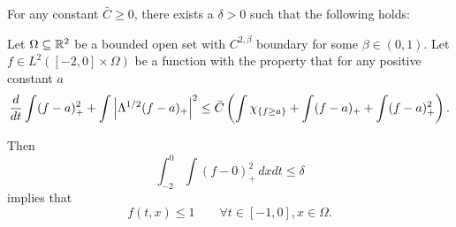 \begin{lemma} \label{thm:DG1 skeleton}
For any constant $\bar{C} \geq 0$, there exists a $\delta>0$ such that the following holds:

Let $\Omega \subseteq \mathbb{R}^2$ be a bounded open set with $C^{2,\beta}$ boundary for some $\beta \in (0,1)$.  
Let $f \in L^2([-2,0]\times\Omega)$ be a function with the property that for any positive constant $a$
\begin{equation} \label{DG energy ddt} \frac{d}{dt} \int (f-a)_+^2 + \int \left\lvert \Lambda^{1/2} (f-a)_+ \right\rvert^2 \leq \bar{C} \left(  \int \chi_{\{f \geq a\}} + \int (f-a)_+ + \int (f-a)_+^2  \right). \end{equation}

Then
\[ \int_{-2}^0 \int (f-0)_+^2 \,dxdt \leq \delta \]
implies that
\[ f(t,x) \leq 1 \qquad \forall t\in[-1,0], x \in \Omega. \]
\end{lemma}

